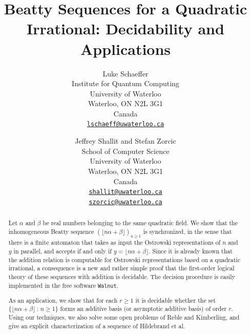 \documentclass[12pt,reqno]{article}
\begin{document}
\theoremstyle{plain}
\newtheorem{theorem}{Theorem}
\newtheorem{corollary}[theorem]{Corollary}
\newtheorem{lemma}[theorem]{Lemma}
\newtheorem{proposition}[theorem]{Proposition}

\theoremstyle{definition}
\newtheorem{definition}[theorem]{Definition}
\newtheorem{example}[theorem]{Example}
\newtheorem{conjecture}[theorem]{Conjecture}

\theoremstyle{remark}
\newtheorem{remark}[theorem]{Remark}


\title{Beatty Sequences for a Quadratic Irrational:  Decidability and Applications}

\def\Que{\mathbb{Q}}
\def\Enn{\mathbb{N}}
\def\Zee{\mathbb{Z}}
\def\AND{\ \wedge\ }
\def\suchthat{\, : \,}
\def\andd{\, \wedge \, }
\def\shift{{\tt shift}}

\author{Luke Schaeffer\\
Institute for Quantum Computing\\
University of Waterloo\\
Waterloo, ON N2L 3G1 \\
Canada\\
\href{mailto:lschaeff@uwaterloo.ca}{\tt lschaeff@uwaterloo.ca}
\and
Jeffrey Shallit and Stefan Zorcic\\
School of Computer Science\\
University of Waterloo\\ 
Waterloo, ON N2L 3G1\\
Canada\\
\href{mailto:shallit@uwaterloo.ca}{\tt shallit@uwaterloo.ca}\\
\href{mailto:szorcic@uwaterloo.ca}{\tt szorcic@uwaterloo.ca}
}

\maketitle


\begin{abstract}
Let $\alpha$ and $\beta$ be real numbers belonging to the same quadratic field.
We show that the inhomogeneous
Beatty sequence $(\lfloor n \alpha + \beta \rfloor)_{n \geq 1}$
is synchronized, in the sense that there is a finite automaton that takes as input
the Ostrowski representations of $n$ and $y$ in parallel, and
accepts if and only if $y =  \lfloor n \alpha + \beta \rfloor$.  Since it is already known that the addition relation is computable for Ostrowski representations based on a quadratic irrational,
a consequence is a new and rather simple proof that the first-order logical theory of these
sequences with addition is decidable.   The decision procedure is easily implemented in the free software
{\tt Walnut}.

As an application, we show
that for each $r \geq 1$ it is decidable whether the set 
$\{  \lfloor n \alpha + \beta \rfloor \suchthat n \geq 1 \}$
forms an additive basis (or asymptotic additive basis) of order $r$.
Using our techniques, we also solve some open problems of
Reble and Kimberling, and give an explicit characterization of a sequence of Hildebrand
et al.
\end{abstract}
\end{document}
